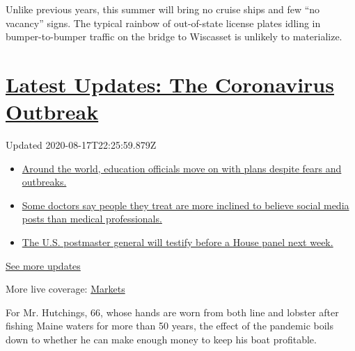 Unlike previous years, this summer will bring no cruise ships and few
``no vacancy'' signs. The typical rainbow of out-of-state license plates
idling in bumper-to-bumper traffic on the bridge to Wiscasset is
unlikely to materialize.

\hypertarget{latest-updates-the-coronavirus-outbreak}{%
\section{\texorpdfstring{\href{https://www.nytimes.com/2020/08/17/world/coronavirus-covid.html?action=click\&pgtype=Article\&state=default\&region=MAIN_CONTENT_1\&context=storylines_live_updates}{Latest
Updates: The Coronavirus
Outbreak}}{Latest Updates: The Coronavirus Outbreak}}\label{latest-updates-the-coronavirus-outbreak}}

Updated 2020-08-17T22:25:59.879Z

\begin{itemize}
\tightlist
\item
  \href{https://www.nytimes.com/2020/08/17/world/coronavirus-covid.html?action=click\&pgtype=Article\&state=default\&region=MAIN_CONTENT_1\&context=storylines_live_updates\#link-744dc989}{Around
  the world, education officials move on with plans despite fears and
  outbreaks.}
\item
  \href{https://www.nytimes.com/2020/08/17/world/coronavirus-covid.html?action=click\&pgtype=Article\&state=default\&region=MAIN_CONTENT_1\&context=storylines_live_updates\#link-23d8429b}{Some
  doctors say people they treat are more inclined to believe social
  media posts than medical professionals.}
\item
  \href{https://www.nytimes.com/2020/08/17/world/coronavirus-covid.html?action=click\&pgtype=Article\&state=default\&region=MAIN_CONTENT_1\&context=storylines_live_updates\#link-21a159a0}{The
  U.S. postmaster general will testify before a House panel next week.}
\end{itemize}

\href{https://www.nytimes.com/2020/08/17/world/coronavirus-covid.html?action=click\&pgtype=Article\&state=default\&region=MAIN_CONTENT_1\&context=storylines_live_updates}{See
more updates}

More live coverage:
\href{https://www.nytimes.com/live/2020/08/17/business/stock-market-today-coronavirus?action=click\&pgtype=Article\&state=default\&region=MAIN_CONTENT_1\&context=storylines_live_updates}{Markets}

For Mr. Hutchings, 66, whose hands are worn from both line and lobster
after fishing Maine waters for more than 50 years, the effect of the
pandemic boils down to whether he can make enough money to keep his boat
profitable.

